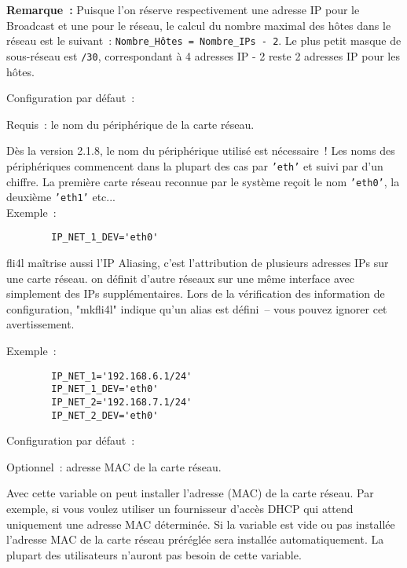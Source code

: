 \begin{description}
{  \textbf{Remarque~:} Puisque l'on réserve respectivement une adresse IP pour
    le Broadcast et une pour le réseau, le calcul du nombre maximal des hôtes
    dans le réseau est le suivant~: \texttt{Nombre\_Hôtes = Nombre\_IPs - 2}.
    Le plus petit masque de sous-réseau est \texttt{/30}, correspondant à 4
    adresses IP - 2 reste 2 adresses IP pour les hôtes.
  }


  Configuration par défaut~: 

  {Requis~: le nom du périphérique de la carte réseau.

    Dès la version 2.1.8, le nom du périphérique utilisé est nécessaire~!
    Les noms des périphériques commencent dans la plupart des cas par
    \texttt{'eth'} et suivi par d'un chiffre. La première carte réseau
    reconnue par le système reçoit le nom \texttt{'eth0'}, la deuxième \texttt{'eth1'} etc...\\

    Exemple~:

\begin{example}
\begin{verbatim}
        IP_NET_1_DEV='eth0'
\end{verbatim}
\end{example}

    fli4l maîtrise aussi l'IP Aliasing, c'est l'attribution de plusieurs adresses
    IPs sur une carte réseau. on définit d'autre réseaux sur une même
    interface avec simplement des IPs supplémentaires. Lors de la vérification
    des information de configuration, "mkfli4l" indique qu'un alias est défini~--
    vous pouvez ignorer cet avertissement.

    Exemple~:

\begin{example}
\begin{verbatim}
        IP_NET_1='192.168.6.1/24'
        IP_NET_1_DEV='eth0'
        IP_NET_2='192.168.7.1/24'
        IP_NET_2_DEV='eth0'
\end{verbatim}
\end{example}
    }


  Configuration par défaut~: 

  {Optionnel~: adresse MAC de la carte réseau.

    Avec cette variable on peut installer l'adresse (MAC) de la carte réseau.
    Par exemple, si vous voulez utiliser un fournisseur d'accès DHCP qui attend
    uniquement une adresse MAC déterminée. Si la variable 
    est vide ou pas installée l'adresse MAC de la carte réseau préréglée sera
    installée automatiquement. La plupart des utilisateurs n'auront pas besoin
    de cette variable.

}
\end{description}
